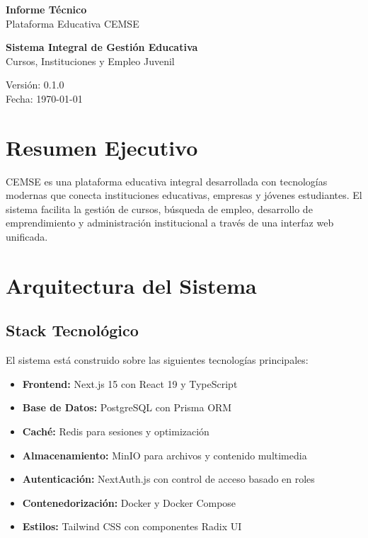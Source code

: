 \documentclass[12pt,a4paper]{article}
\begin{document}
\begin{titlepage}
    \centering
    \vspace*{2cm}

    {\Huge\bfseries Informe Técnico\\[0.5cm]}
    {\LARGE Plataforma Educativa CEMSE\\[2cm]}

    \begin{tcolorbox}[colback=blue!5!white,colframe=blue!75!black,width=0.8\textwidth]
        \centering
        \large
        \textbf{Sistema Integral de Gestión Educativa}\\
        Cursos, Instituciones y Empleo Juvenil
    \end{tcolorbox}

    \vfill

    {\large Versión: 0.1.0\\[0.5cm]}
    {\large Fecha: \today}

\end{titlepage}

\newpage
\tableofcontents
\newpage

\section{Resumen Ejecutivo}

CEMSE es una plataforma educativa integral desarrollada con tecnologías modernas que conecta instituciones educativas, empresas y jóvenes estudiantes. El sistema facilita la gestión de cursos, búsqueda de empleo, desarrollo de emprendimiento y administración institucional a través de una interfaz web unificada.

\section{Arquitectura del Sistema}

\subsection{Stack Tecnológico}

El sistema está construido sobre las siguientes tecnologías principales:

\begin{itemize}
    \item \textbf{Frontend:} Next.js 15 con React 19 y TypeScript
    \item \textbf{Base de Datos:} PostgreSQL con Prisma ORM
    \item \textbf{Caché:} Redis para sesiones y optimización
    \item \textbf{Almacenamiento:} MinIO para archivos y contenido multimedia
    \item \textbf{Autenticación:} NextAuth.js con control de acceso basado en roles
    \item \textbf{Contenedorización:} Docker y Docker Compose
    \item \textbf{Estilos:} Tailwind CSS con componentes Radix UI
\end{itemize}
\end{document}
